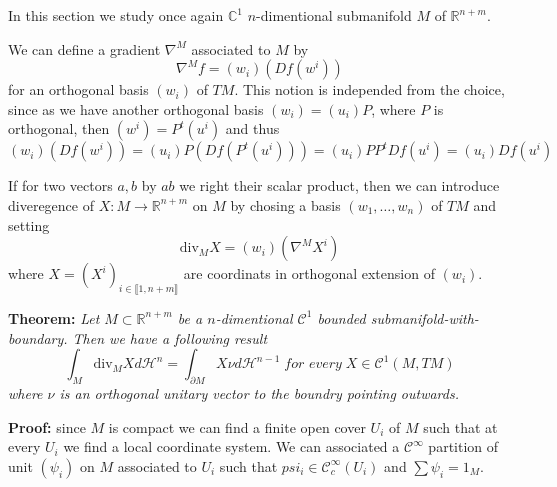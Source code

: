In this section we study once again $\mathbb C^1$ $n$-dimentional submanifold $M$
of $\mathbb R^{n+m}$.

\vspace{2ex}
We can define a gradient $\nabla^M$ associated to $M$ by
\[\nabla^M f = (w_i)(Df(w^i))\]
for an orthogonal basis $(w_i)$ of $TM$. This notion is independed from the choice,
since as we have another orthogonal basis $(w_i)=(u_i)P$, where $P$ is orthogonal, 
then $(w^i)=P^t(u^i)$ and thus $(w_i)(Df(w^i))=(u_i)P(Df(P^t(u^i)))=(u_i)PP^tDf(u^i)=(u_i)Df(u^i)$

\vspace{2ex}
If for two vectors $a,b$ by $ab$ we right their scalar product, then we can
introduce diveregence of $X:M\rightarrow\mathbb R^{n+m}$ on $M$ by chosing
a basis $(w_1,\ldots,w_n)$ of $TM$ and setting
\[\text{div}_MX=(w_i)(\nabla^MX^i)\]
where $X=(X^i)_{i\in\llbracket1,n+m\rrbracket}$ are coordinats in orthogonal
extension of $(w_i)$.

\vspace{2ex}
\textbf{Theorem:} \textit{Let $M\subset \mathbb R^{n+m}$ be a $n$-dimentional
$\mathcal C^1$ bounded submanifold-with-boundary. Then we have a following result}
\[\int_M \text{div}_MXd\mathcal H^n=\int_{\partial M}X\nu d\mathcal H^{n-1}\;\textit{for every}\;X\in\mathcal C^1(M,TM)\]
\textit{where $\nu$ is an orthogonal unitary vector to the boundry pointing outwards.}

\vspace{1ex}
\textbf{Proof:} since $M$ is compact we can find a finite open cover $U_i$ of
$M$ such that at every $U_i$ we find a local coordinate system. We can associated
a $\mathcal C^\infty$ partition of unit $(\psi_i)$ on $M$ associated to $U_i$ such
that $psi_i\in\mathcal C^\infty_c(U_i)$ and $\sum\psi_i=1_M$.

